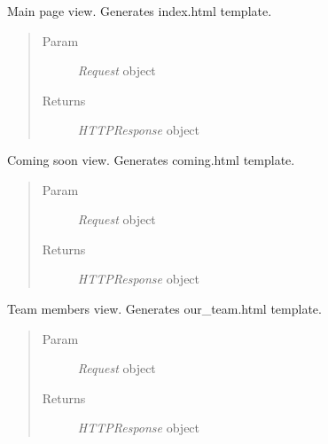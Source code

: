 \documentclass[letterpaper,10pt,english]{sphinxmanual}
\begin{document}
\begin{fulllineitems}
\label{web_portal:core.main.views.index}
Main page view. Generates index.html template.
\begin{quote}\begin{description}
\item[{Param}] \leavevmode
\emph{Request} object

\item[{Returns}] \leavevmode
\emph{HTTPResponse} object

\end{description}\end{quote}

\end{fulllineitems}


\begin{fulllineitems}
\label{web_portal:core.main.views.coming}
Coming soon view. Generates coming.html template.
\begin{quote}\begin{description}
\item[{Param}] \leavevmode
\emph{Request} object

\item[{Returns}] \leavevmode
\emph{HTTPResponse} object

\end{description}\end{quote}

\end{fulllineitems}


\begin{fulllineitems}
\label{web_portal:core.main.views.our_team}
Team members view. Generates our\_team.html template.
\begin{quote}\begin{description}
\item[{Param}] \leavevmode
\emph{Request} object

\item[{Returns}] \leavevmode
\emph{HTTPResponse} object

\end{description}\end{quote}

\end{fulllineitems}
\end{document}
